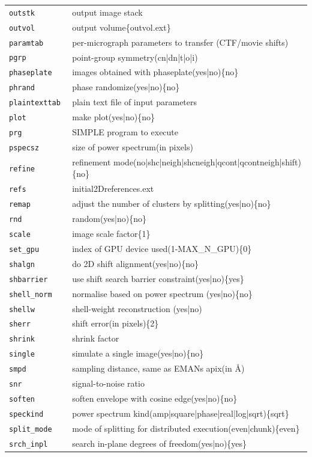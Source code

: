 \documentclass[a4paper,11pt]{article}
\begin{document}
\begin{tabular}{ll}
\texttt{outstk       }&{ output image stack}\\
\texttt{outvol       }&{ output volume\{outvol.ext\}}\\
\texttt{paramtab     }&{ per-micrograph parameters to transfer (CTF/movie shifts)}\\
\texttt{pgrp         }&{ point-group symmetry(cn|dn|t|o|i)}\\
\texttt{phaseplate   }&{ images obtained with phaseplate(yes|no)\{no\}}\\
\texttt{phrand       }&{ phase randomize(yes|no)\{no\}}\\
\texttt{plaintexttab }&{ plain text file of input parameters}\\
\texttt{plot         }&{ make plot(yes|no)\{no\}}\\
\texttt{prg          }&{ SIMPLE program to execute}\\
\texttt{pspecsz      }&{ size of power spectrum(in pixels)}\\
\texttt{refine       }&{ refinement mode(no|shc|neigh|shcneigh|qcont|qcontneigh|shift)\{no\}}\\
\texttt{refs         }&{ initial2Dreferences.ext}\\
\texttt{remap        }&{ adjust the number of clusters by splitting(yes|no)\{no\}}\\
\texttt{rnd          }&{ random(yes|no)\{no\}}\\
\texttt{scale        }&{ image scale factor\{1\}}\\
\texttt{set\_gpu      }&{ index of GPU device used(1-MAX\_N\_GPU)\{0\}}\\
\texttt{shalgn       }&{ do 2D shift alignment(yes|no)\{no\}}\\
\texttt{shbarrier    }&{ use shift search barrier constraint(yes|no)\{yes\}}\\
\texttt{shell\_norm   }&{ normalise based on power spectrum (yes|no)\{no\}}\\
\texttt{shellw       }&{ shell-weight reconstruction (yes|no)}\\
\texttt{sherr        }&{ shift error(in pixels)\{2\}}\\
\texttt{shrink       }&{ shrink factor}\\
\texttt{single       }&{ simulate a single image(yes|no)\{no\}}\\
\texttt{smpd         }&{ sampling distance, same as EMANs apix(in \AA{})}\\
\texttt{snr          }&{ signal-to-noise ratio}\\
\texttt{soften       }&{ soften envelope with cosine edge(yes|no)\{no\}}\\
\texttt{speckind     }&{ power spectrum kind(amp|square|phase|real|log|sqrt)\{sqrt\}}\\
\texttt{split\_mode   }&{ mode of splitting for distributed execution(even|chunk)\{even\}}\\
\texttt{srch\_inpl    }&{ search in-plane degrees of freedom(yes|no)\{yes\}}\\
\end{tabular}
\end{document}

